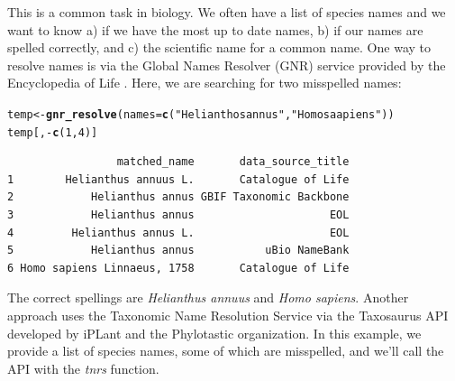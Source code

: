 \documentclass[10pt]{article}\usepackage[]{graphicx}\usepackage[]{color}
\makeatletter
\newcommand{\hlfunctioncall}[1]{\textcolor[rgb]{0.501960784313725,0,0.329411764705882}{\textbf{#1}}}%
\newcommand{\hlstring}[1]{\textcolor[rgb]{0.6,0.6,1}{#1}}%
\newenvironment{kframe}{%
 \def\at@end@of@kframe{}%
 \ifinner\ifhmode%
  \def\at@end@of@kframe{\end{minipage}}%
  \begin{minipage}{\columnwidth}%
 \fi\fi%
 \def\FrameCommand##1{\hskip\@totalleftmargin \hskip-\fboxsep
 \colorbox{shadecolor}{##1}\hskip-\fboxsep
     \hskip-\linewidth \hskip-\@totalleftmargin \hskip\columnwidth}%
 \MakeFramed {\advance\hsize-\width
   \@totalleftmargin\z@ \linewidth\hsize
   \@setminipage}}%
 {\par\unskip\endMakeFramed%
 \at@end@of@kframe}
\newenvironment{knitrout}{}{} %
\makeatother
\begin{document}
This is a common task in biology. We often have a list of species names and we want to know a) if we have the most up to date names, b) if our names are spelled correctly, and c) the scientific name for a common name. One way to resolve names is via the Global Names Resolver (GNR) service provided by the Encyclopedia of Life \cite{eolgnr}. Here, we are searching for two misspelled names:

\begin{knitrout}
\color{fgcolor}\begin{kframe}
\begin{alltt}
temp <- \hlfunctioncall{gnr_resolve}(names = \hlfunctioncall{c}(\hlstring{"Helianthos annus"}, \hlstring{"Homo saapiens"}))
temp[, -\hlfunctioncall{c}(1, 4)]
\end{alltt}
\begin{verbatim}
                 matched_name       data_source_title
1        Helianthus annuus L.       Catalogue of Life
2            Helianthus annus GBIF Taxonomic Backbone
3            Helianthus annus                     EOL
4         Helianthus annus L.                     EOL
5            Helianthus annus           uBio NameBank
6 Homo sapiens Linnaeus, 1758       Catalogue of Life
\end{verbatim}
\end{kframe}
\end{knitrout}


The correct spellings are \emph{Helianthus annuus} and \emph{Homo sapiens}. Another approach uses the Taxonomic Name Resolution Service via the Taxosaurus API \cite{taxosaurus} developed by iPLant and the Phylotastic organization. In this example, we provide a list of species names, some of which are misspelled, and we'll call the API with the \emph{tnrs} function.
\end{document}
